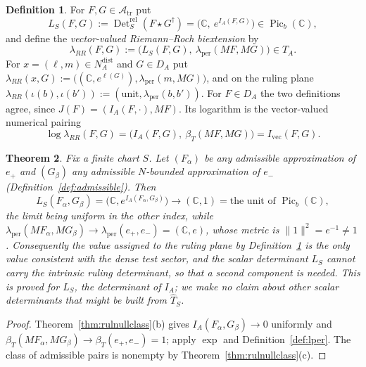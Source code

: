 \documentclass[11pt]{amsart}
\newtheorem{theorem}{Theorem}[section]
\theoremstyle{definition}
\newtheorem{definition}[theorem]{Definition}
\theoremstyle{remark}
\newcommand{\C}{\mathbb C}
\newcommand{\Det}{\operatorname{Det}}
\newcommand{\Picb}{\operatorname{Pic}_{b}}
\newcommand{\Th}{\widehat{T}}
\newcommand{\DA}{D_A}
\newcommand{\Atr}{\mathcal A_{\mathrm{tr}}}
\newcommand{\NAd}{N_A^{\mathrm{dist}}}
\begin{document}
\begin{definition}\label{def:RR}
For $F,G\in\Atr$ put
\begin{equation}\label{eq:LS}
L_S(F,G):=\Det^{\mathrm{rel}}_S(F\star G^{\dagger})=
\bigl(\C,\ e^{I_A(F,G)}\bigr)\in\Picb(\C),
\end{equation}
and define the \emph{vector-valued Riemann--Roch biextension} by
\begin{equation}\label{eq:lRR}
\lambda_{RR}(F,G):=\bigl(L_S(F,G),\ \lambda_{\mathrm{per}}(MF,MG)\bigr)\in T_A .
\end{equation}
For $x=(\ell,m)\in\NAd$ and $G\in\DA$ put
$\lambda_{RR}(x,G):=\bigl((\C,e^{\ell(G)}),\lambda_{\mathrm{per}}(m,MG)\bigr)$,
and on the ruling plane
$\lambda_{RR}(\iota(b),\iota(b')):=(\mathrm{unit},\lambda_{\mathrm{per}}(b,b'))$.  For
$F\in\DA$ the two definitions agree, since $J(F)=(I_A(F,\cdot),MF)$.  Its
logarithm is the vector-valued numerical pairing
\begin{equation}\label{eq:logRR}
\log\lambda_{RR}(F,G)=\bigl(I_A(F,G),\ \beta_T(MF,MG)\bigr)
=I_{\mathrm{vec}}(F,G).
\end{equation}
\end{definition}

\begin{theorem}\label{thm:scalartrivial}
Fix a finite chart $S$.  Let $(F_{\alpha})$ be any admissible approximation of
$e_+$ and $(G_{\beta})$ any admissible $N$-bounded approximation of $e_-$
(Definition~\ref{def:admissible}).  Then
\begin{equation}\label{eq:trivial}
L_S(F_{\alpha},G_{\beta})=\bigl(\C,e^{I_A(F_{\alpha},G_{\beta})}\bigr)
\longrightarrow(\C,1)=\text{the unit of }\Picb(\C),
\end{equation}
the limit being uniform in the other index, while
$\lambda_{\mathrm{per}}(MF_{\alpha},MG_{\beta})\to
\lambda_{\mathrm{per}}(e_+,e_-)=(\C,e)$, whose metric is
$\lVert1\rVert^{2}=e^{-1}\ne1$.  Consequently the value assigned to the ruling
plane by Definition~\ref{def:RR} is the only value consistent with the dense
test sector, and the scalar determinant $L_S$ cannot carry the intrinsic
ruling determinant, so that a second component is needed.  This is proved for
$L_S$, the determinant of $I_A$; we make no claim about other scalar
determinants that might be built from $\Th_S$.
\end{theorem}

\begin{proof}
Theorem~\ref{thm:rulnullclass}(b) gives $I_A(F_{\alpha},G_{\beta})\to0$
uniformly and $\beta_T(MF_{\alpha},MG_{\beta})\to\beta_T(e_+,e_-)=1$; apply
$\exp$ and Definition~\ref{def:lper}.  The class of admissible pairs is
nonempty by Theorem~\ref{thm:rulnullclass}(c).
\end{proof}
\end{document}
